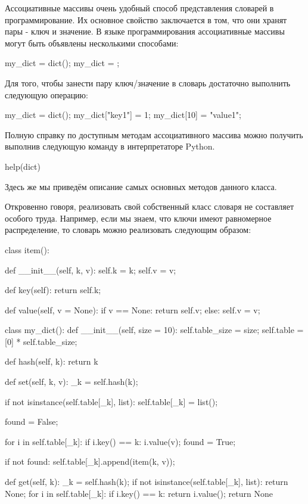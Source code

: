 Ассоциативные массивы очень удобный способ представления словарей
в программирование. Их основное свойство заключается в том, что 
они хранят пары - ключ и значение. В языке программирования 
ассоциативные массивы могут быть объявлены несколькими способами:

\begin{python}
my_dict = dict();
my_dict = {};
\end{python}

Для того, чтобы занести пару ключ/значение в словарь достаточно выполнить следующую
операцию:

\begin{python}
my_dict = dict();
my_dict["key1"] = 1;
my_dict[10] = "value1";
\end{python}

Полную справку по доступным методам ассоциативного массива можно получить 
выполнив следующую команду в интерпретаторе Python.

\begin{python}
help(dict)
\end{python}

Здесь же мы приведём описание самых основных методов данного класса. 

Откровенно говоря, реализовать свой собственный класс словаря не составляет
особого труда. Например, если мы знаем, что ключи имеют равномерное 
распределение, то словарь можно реализовать следующим образом:

\begin{python}
class item():

	def __init__(self, k, v):
		self.k = k;
		self.v = v;

	def key(self):
		return self.k;

	def value(self, v = None):
		if v == None:
			return self.v;
		else:
			self.v = v;

class my_dict():
	def __init__(self, size = 10):
		self.table_size = size;
		self.table = [0] * self.table_size;

	def hash(self, k):
		return k %

	def set(self, k, v):
		_k = self.hash(k);

		if not isinstance(self.table[_k], list):
			self.table[_k] = list();

		found = False;

		for i in self.table[_k]:
			if i.key() == k:
				i.value(v);	
				found = True;

		if not found:
			self.table[_k].append(item(k, v));


	def get(self, k):
		_k = self.hash(k);
		if not isinstance(self.table[_k], list):
			return None;
		for i in self.table[_k]:
			if i.key() == k:
				return i.value();
		return None
\end{python}

